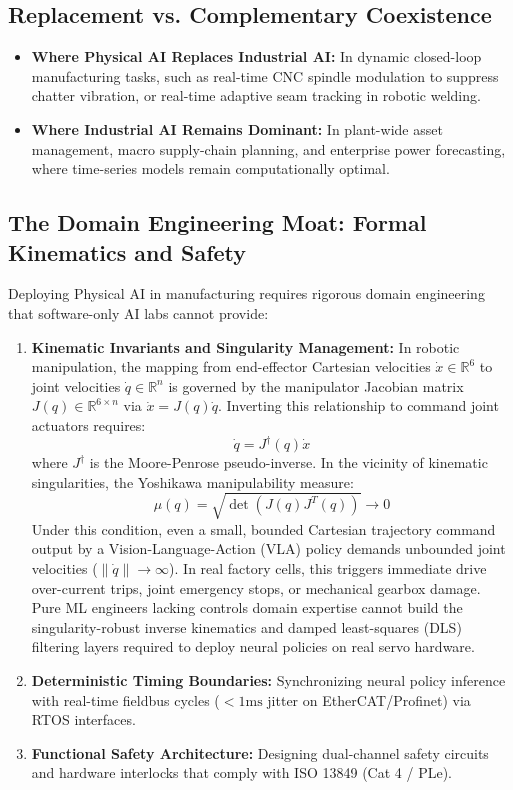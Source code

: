 \documentclass[11pt,a4paper]{article}
\begin{document}
\subsection{Replacement vs. Complementary Coexistence}
\begin{itemize}
    \item \textbf{Where Physical AI Replaces Industrial AI:} In dynamic closed-loop manufacturing tasks, such as real-time CNC spindle modulation to suppress chatter vibration, or real-time adaptive seam tracking in robotic welding.
    \item \textbf{Where Industrial AI Remains Dominant:} In plant-wide asset management, macro supply-chain planning, and enterprise power forecasting, where time-series models remain computationally optimal.
\end{itemize}

\subsection{The Domain Engineering Moat: Formal Kinematics and Safety}
Deploying Physical AI in manufacturing requires rigorous domain engineering that software-only AI labs cannot provide:

\begin{enumerate}
    \item \textbf{Kinematic Invariants and Singularity Management:}
    In robotic manipulation, the mapping from end-effector Cartesian velocities $\dot{x} \in \mathbb{R}^6$ to joint velocities $\dot{q} \in \mathbb{R}^n$ is governed by the manipulator Jacobian matrix $J(q) \in \mathbb{R}^{6 \times n}$ via $\dot{x} = J(q)\dot{q}$. Inverting this relationship to command joint actuators requires:
    \[
    \dot{q} = J^{\dagger}(q)\dot{x}
    \]
    where $J^{\dagger}$ is the Moore-Penrose pseudo-inverse. In the vicinity of kinematic singularities, the Yoshikawa manipulability measure:
    \[
    \mu(q) = \sqrt{\det\left(J(q)J^T(q)\right)} \longrightarrow 0
    \]
    Under this condition, even a small, bounded Cartesian trajectory command output by a Vision-Language-Action (VLA) policy demands unbounded joint velocities ($\|\dot{q}\| \to \infty$). In real factory cells, this triggers immediate drive over-current trips, joint emergency stops, or mechanical gearbox damage. Pure ML engineers lacking controls domain expertise cannot build the singularity-robust inverse kinematics and damped least-squares (DLS) filtering layers required to deploy neural policies on real servo hardware.

    \item \textbf{Deterministic Timing Boundaries:}
    Synchronizing neural policy inference with real-time fieldbus cycles ($<1\text{ms}$ jitter on EtherCAT/Profinet) via RTOS interfaces.

    \item \textbf{Functional Safety Architecture:}
    Designing dual-channel safety circuits and hardware interlocks that comply with ISO 13849 (Cat 4 / PLe).
\end{enumerate}
\end{document}
